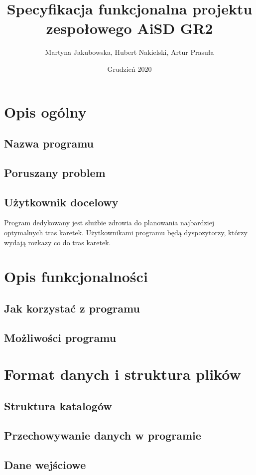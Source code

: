 \documentclass[]{article}
\title{Specyfikacja funkcjonalna projektu zespołowego \textbf{AiSD GR2}}
\author{Martyna Jakubowska, Hubert Nakielski, Artur Prasuła}
\date{Grudzień 2020}
\begin{document}
\maketitle


\section{Opis ogólny}
\subsection{Nazwa programu} %
\subsection{Poruszany problem} %
\subsection{Użytkownik docelowy}
Program dedykowany jest służbie zdrowia do planowania najbardziej optymalnych tras karetek.
Użytkownikami programu będą dyspozytorzy, którzy wydają rozkazy co do tras karetek.


\section{Opis funkcjonalności}
\subsection{Jak korzystać z programu} %
\subsection{Możliwości programu} %


\section{Format danych i struktura plików}
\subsection{Struktura katalogów} %
\subsection{Przechowywanie danych w programie} %
\subsection{Dane wejściowe} %
\end{document}
